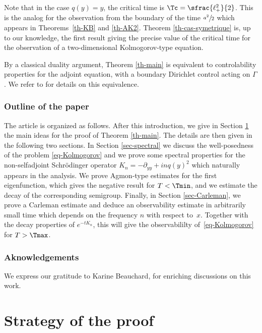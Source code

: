 Note that in the case $q(y) = y$, the critical time is $\Tc = \sfrac{\ell_+^2}{2}$. This is the analog for the observation from the boundary of the time $\sfrac {a^2}2$ which appears in Theorems~\ref{th-KB} and \ref{th-AK2}. Theorem \ref{th-cas-symetrique} is,
up to our knowledge, the first result giving the precise value of the critical time for the observation
of a two-dimensional Kolmogorov-type equation.

\begin{remark}
By a classical duality argument, Theorem \ref{th-main} is equivalent to controlability properties for the adjoint equation, with a boundary Dirichlet control acting on $\Gamma$. We refer to \cite{tucsnak} for details on this equivalence.
\end{remark}

\subsubsection*{Outline of the paper} The article is organized as follows. After this introduction, we give in Section \ref{sec-strategy} the main ideas for the proof of Theorem \ref{th-main}. The details are then given in the following two sections. In Section \ref{sec-spectral} we discuss the well-posedness of the problem \eqref{eq-Kolmogorov} and we prove some spectral properties for the non-selfadjoint Schrödinger operator $K_n = -\partial_{yy} + inq(y)^2$ which naturally appears in the analysis. We prove Agmon-type estimates for the first eigenfunction, which gives the negative result for $T < \Tmin$, and we estimate the decay of the corresponding semigroup. Finally, in Section \ref{sec-Carleman}, we prove a Carleman estimate and deduce an observability estimate in arbitrarily small time which depends on the frequency $n$ with respect to~$x$. Together with the decay properties of $e^{-tK_n}$, this will give the observabililty of~\eqref{eq-Kolmogorov} for $T > \Tmax$.

\subsubsection*{Aknowledgements} We express our gratitude to Karine Beauchard, for enriching discussions on this work.


\section{Strategy of the proof} \label{sec-strategy}

